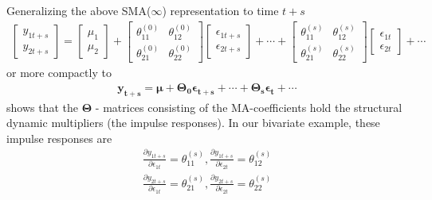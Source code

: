 \documentclass[a4paper,11pt,listof=nochaptergap,oneside,pointednumbers,bibtotoc,bigheadings,liststotoc]{scrbook}
\theoremstyle{mysatz}
\theoremstyle{mydefinition}
\theoremstyle{mytheorem}
\theoremstyle{mybemerkung}
\newcommand{\vect}[1]{\boldsymbol{\mathbf{#1}}}
\begin{document}
Generalizing the above SMA($\infty$) representation to time $t+s$
\begin{equation} \label{eq:svar10}
\begin{split}
	\begin{bmatrix}
    	y_{1t+s} \\
    	y_{2t+s}
 	\end{bmatrix} 
	=
	\begin{bmatrix}
    	\mu_1 \\
    	\mu_2
 	\end{bmatrix} + 
	\begin{bmatrix}
    	\theta_{11}^{(0)} & \theta_{12}^{(0)}\\
    	\theta_{21}^{(0)} & \theta_{22}^{(0)}
 	\end{bmatrix} 
	\begin{bmatrix}
    	\epsilon_{1t + s} \\
	\epsilon_{2t+s}
 	\end{bmatrix} + \cdots +
	\begin{bmatrix}
    	\theta_{11}^{(s)} & \theta_{12}^{(s)}\\
    	\theta_{21}^{(s)} & \theta_{22}^{(s)}
 	\end{bmatrix} 
	\begin{bmatrix}
    	\epsilon_{1t} \\
	\epsilon_{2t}
 	\end{bmatrix} + \cdots 
\end{split}								
\end{equation}
or more compactly to 
\begin{equation} \label{eq:svar8_1}
\begin{split}
 		\vect{y_{t+s}} = \vect{\mu} + \vect{\Theta_0}\vect{\epsilon_{t+s}} + \cdots + \vect{\Theta_s}\vect{\epsilon_{t}} + \cdots
\end{split}								
\end{equation}
shows that the $\vect{\Theta}$ - matrices consisting of the MA-coefficients hold the structural dynamic multipliers (the impulse responses). In our bivariate example, these impulse responses are
\begin{equation} \label{eq:svar9}
\begin{split}
 		\frac{\partial y_{1t+s}}{\partial \epsilon_{1t}} = \theta_{11}^{(s)}, \frac{\partial y_{1t+s}}{\partial \epsilon_{2t}} = \theta_{12}^{(s)} \\
		\frac{\partial y_{2t+s}}{\partial \epsilon_{1t}} = \theta_{21}^{(s)}, \frac{\partial y_{2t+s}}{\partial \epsilon_{2t}} = \theta_{22}^{(s)}
\end{split}								
\end{equation}
\end{document}
